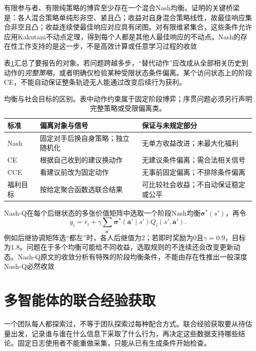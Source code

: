 有限参与者、有限纯策略的博弈至少存在一个混合Nash均衡。证明的关键桥梁是：各人混合策略单纯形非空、紧且凸；收益对自身混合策略线性，故最佳响应集合非空且凸；收益连续使最佳响应对应具有闭图。对有限维紧集合，这些条件允许应用Kakutani不动点定理，得到每个人都是其他人最佳响应的不动点。Nash的存在性工作支持的是这一步，不是高效计算或任意学习过程的收敛

表\ref{tab:rl-multi-agent-equilibria}汇总了要报告的对象。若问题跨越多步，“替代动作”应改成从全部相关历史到动作的\emph{完整策略}，或者明确仅检验某种受限状态条件偏离。某个访问状态上的阶段CE，不能自动保证整条轨迹无人能通过改变后续行为获利。

\begin{table}[htbp]
 \centering
 \begin{tabularx}{\linewidth}{@{}l >{\raggedright\arraybackslash}X >{\raggedright\arraybackslash}X@{}}
 \toprule
 标准 & 偏离对象与信号 & 保证与未规定部分\\
 \midrule
 Nash & 固定对手后换自身策略；独立随机化 & 无单方收益改进；未最大化福利\\
 CE & 根据自己收到的建议换动作 & 无建议条件偏离；需合法相关信号\\
 CCE & 看建议前改为固定动作 & 无事前固定偏离；不排除条件偏离\\
 福利目标 & 按给定聚合函数选联合结果 & 可比较社会收益；不自动保证稳定或公平\\
 \bottomrule
 \end{tabularx}
 \caption{均衡与社会目标的区别。表中动作约束属于固定阶段博弈；序贯问题必须另行声明完整策略或受限偏离类。}
 \label{tab:rl-multi-agent-equilibria}
\end{table}

Nash-Q在每个后继状态的多张价值矩阵中选取一个阶段Nash均衡$\bm\sigma^*(s')$，再令
\[
 y_i=r_i+\gamma\sum_{\bm a'}\bm\sigma^*(\bm a'\mid s')
                         Q_i(s',\bm a').
\]
例如后继协调矩阵选“都左”时，各人后继值为2；若即时奖励为0且$\gamma=0.9$，目标为1.8。问题在于多个均衡可能给不同收益，选取规则的不连续还会改变更新动态。Nash-Q原文的收敛分析有特殊的阶段均衡条件，不能由存在性推出一般深度Nash-Q必然收敛

\section{多智能体的联合经验获取}
\label{sec:rl-multi-agent-data}

一个团队每人都探索过，不等于团队探索过每种配合方式。联合经验获取要从待估量出发，记录谁与谁在什么信息下采取了什么行为，再决定这些数据支持哪些结论。固定日志使用者不能重做采集，只能从已有生成条件开始检查。

